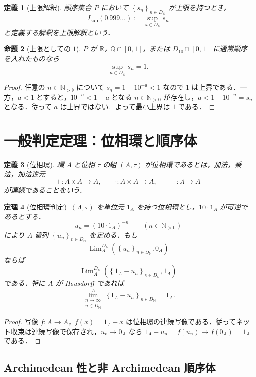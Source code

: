 \documentclass[a4paper,11pt]{ltjsarticle}
\theoremstyle{jpdef}
\newtheorem{definition}{定義}[section]
\theoremstyle{jpthm}
\newtheorem{theorem}[definition]{定理}
\newtheorem{proposition}[definition]{命題}
\newcommand{\N}{\mathbb{N}}
\newcommand{\Q}{\mathbb{Q}}
\newcommand{\R}{\mathbb{R}}
\newcommand{\Lim}{\operatorname{Lim}}
\newcommand{\Ns}{\N_{>0}}
\newcommand{\DN}{D_{\N}}
\newcommand{\seq}[2]{\left\{#1\right\}_{#2}}
\begin{document}
\begin{definition}[上限解釈]
順序集合 \(P\) において \(\seq{s_n}{n\in\DN}\) が上限を持つとき，
\[
  I_{\sup}(0.999\ldots):=\sup_{n\in\DN}s_n
\]
と定義する解釈を上限解釈という．
\end{definition}

\begin{proposition}[上限としての \(1\)]
\(P\) が \(\R\)，\(\Q\cap[0,1]\)，または \(D_{10}\cap[0,1]\) に通常順序を入れたものなら
\[
  \sup_{n\in\DN}s_n=1.
\]
\end{proposition}

\begin{proof}
任意の \(n\in\Ns\) について \(s_n=1-10^{-n}<1\) なので \(1\) は上界である．一方，\(a<1\) とすると，\(10^{-n}<1-a\) となる \(n\in\Ns\) が存在し，\(a<1-10^{-n}=s_n\) となる．従って \(a\) は上界ではない．よって最小上界は \(1\) である．
\end{proof}

\section{一般判定定理：位相環と順序体}

\begin{definition}[位相環]
環 \(A\) と位相 \(\tau\) の組 \((A,\tau)\) が位相環であるとは，加法，乗法，加法逆元
\[
  +:A\times A\to A,
  \qquad
  \cdot:A\times A\to A,
  \qquad
  -:A\to A
\]
が連続であることをいう．
\end{definition}

\begin{theorem}[位相環判定]
\((A,\tau)\) を単位元 \(1_A\) を持つ位相環とし，\(10\cdot1_A\) が可逆であるとする．
\[
  u_n=(10\cdot1_A)^{-n}\qquad(n\in\Ns)
\]
により \(A\)-値列 \(\seq{u_n}{n\in\DN}\) を定める．もし
\[
  \Lim_A^{\DN}(\seq{u_n}{n\in\DN},0_A)
\]
ならば
\[
  \Lim_A^{\DN}(\seq{1_A-u_n}{n\in\DN},1_A)
\]
である．特に \(A\) が Hausdorff であれば
\[
  \lim_{\substack{n\to\infty\\ n\in\DN}}^{A}\seq{1_A-u_n}{n\in\DN}=1_A.
\]
\end{theorem}

\begin{proof}
写像 \(f:A\to A\)，\(f(x)=1_A-x\) は位相環の連続写像である．従ってネット収束は連続写像で保存され，\(u_n\to0_A\) なら \(1_A-u_n=f(u_n)\to f(0_A)=1_A\) である．
\end{proof}


\subsection{Archimedean 性と非 Archimedean 順序体}
\end{document}
